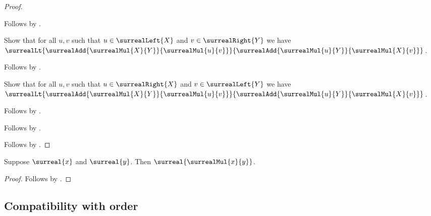 \begin{proof}
\begin{subproof}
\begin{subproof}
            Follows by
                .
        \end{subproof}
        Show that for all $u,v$ such that
            $u\in\surrealLeft{X}$ and $v\in\surrealRight{Y}$ we have
            $\surrealLt
                {\surrealAdd{\surrealMul{X}{Y}}{\surrealMul{u}{v}}}
                {\surrealAdd{\surrealMul{u}{Y}}{\surrealMul{X}{v}}}$.
        \begin{subproof}
            Follows by
                .
        \end{subproof}
        Show that for all $u,v$ such that
            $u\in\surrealRight{X}$ and $v\in\surrealLeft{Y}$ we have
            $\surrealLt
                {\surrealAdd{\surrealMul{X}{Y}}{\surrealMul{u}{v}}}
                {\surrealAdd{\surrealMul{u}{Y}}{\surrealMul{X}{v}}}$.
        \begin{subproof}
            Follows by
                .
        \end{subproof}
        Follows by .
    \end{subproof}
    Follows by .
\end{proof}

\begin{corollary}\label{surreal_mul_is_surreal}
    Suppose $\surreal{x}$ and $\surreal{y}$.
    Then $\surreal{\surrealMul{x}{y}}$.
\end{corollary}
\begin{proof}
    Follows by .
\end{proof}

\subsection{Compatibility with order}

